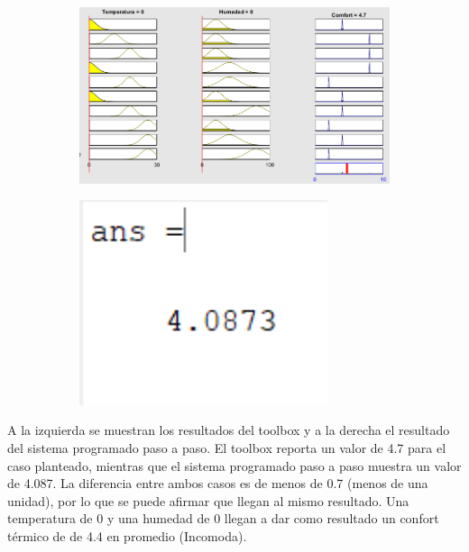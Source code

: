 \documentclass[11pt, letterpaper]{article}
\begin{document}
\begin{figure}[h]
	\centering
	\begin{subfigure}{0.40\textwidth} %
		\centering
		\includegraphics[width=1.4\textwidth]{IMG/RP21.png}
		\label{fig:G12}
	\end{subfigure}
	\hfill
	\begin{subfigure}{0.42\textwidth} %
		\centering
		\includegraphics[width=0.8\textwidth]{IMG/M21.png}
		\label{fig:G13}
	\end{subfigure}
	\label{fig:comparacion6}
\end{figure}

A la izquierda se muestran los resultados del toolbox y a la derecha el resultado del sistema programado paso a paso. El toolbox reporta un valor de 4.7 para el caso planteado, mientras que el sistema programado paso a paso muestra un valor de 4.087. La diferencia entre ambos casos es de menos de 0.7 (menos de una unidad), por lo que se puede afirmar que llegan al mismo resultado. Una temperatura de 0 y una humedad de 0 llegan a dar como resultado un confort térmico de de 4.4 en promedio (Incomoda).
\end{document}

